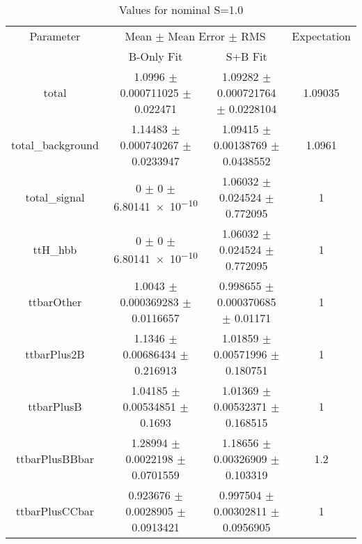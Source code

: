 \begin{table}
\centering
\caption{Values for nominal S=1.0}
\begin{tabular}{cccc}
\toprule
Parameter & \multicolumn{2}{c}{Mean $\pm$ Mean Error $\pm$ RMS} & Expectation\\
 & B-Only Fit & S+B Fit & \\
\midrule
total & \num{1.0996} $\pm$ \num{0.000711025} $\pm$ \num{0.022471} & \num{1.09282} $\pm$ \num{0.000721764} $\pm$ \num{0.0228104} & \num{1.09035}\\
total\_background & \num{1.14483} $\pm$ \num{0.000740267} $\pm$ \num{0.0233947} & \num{1.09415} $\pm$ \num{0.00138769} $\pm$ \num{0.0438552} & \num{1.0961}\\
total\_signal & \num{0} $\pm$ \num{0} $\pm$ \num{6.80141e-10} & \num{1.06032} $\pm$ \num{0.024524} $\pm$ \num{0.772095} & \num{1}\\
ttH\_hbb & \num{0} $\pm$ \num{0} $\pm$ \num{6.80141e-10} & \num{1.06032} $\pm$ \num{0.024524} $\pm$ \num{0.772095} & \num{1}\\
ttbarOther & \num{1.0043} $\pm$ \num{0.000369283} $\pm$ \num{0.0116657} & \num{0.998655} $\pm$ \num{0.000370685} $\pm$ \num{0.01171} & \num{1}\\
ttbarPlus2B & \num{1.1346} $\pm$ \num{0.00686434} $\pm$ \num{0.216913} & \num{1.01859} $\pm$ \num{0.00571996} $\pm$ \num{0.180751} & \num{1}\\
ttbarPlusB & \num{1.04185} $\pm$ \num{0.00534851} $\pm$ \num{0.1693} & \num{1.01369} $\pm$ \num{0.00532371} $\pm$ \num{0.168515} & \num{1}\\
ttbarPlusBBbar & \num{1.28994} $\pm$ \num{0.0022198} $\pm$ \num{0.0701559} & \num{1.18656} $\pm$ \num{0.00326909} $\pm$ \num{0.103319} & \num{1.2}\\
ttbarPlusCCbar & \num{0.923676} $\pm$ \num{0.0028905} $\pm$ \num{0.0913421} & \num{0.997504} $\pm$ \num{0.00302811} $\pm$ \num{0.0956905} & \num{1}\\
\bottomrule
\end{tabular}
\end{table}